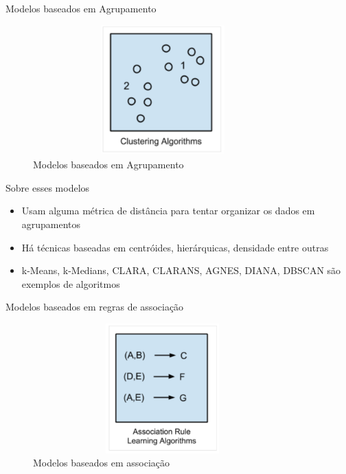 \begin{frame}	
	\begin{block}{Modelos baseados em Agrupamento}	
		\begin{figure}[!htb]
			\centering	  				
			\includegraphics[height=5cm, width = 10cm]{./pic/cluster.png}
			\caption{Modelos baseados em Agrupamento}
			\label{fig_modelos}
		\end{figure}
	\end{block}
\end{frame}


\begin{frame}	
	\begin{block}{Sobre esses modelos}	
		\begin{itemize}
			\item Usam alguma métrica de distância para tentar organizar os dados em agrupamentos
			\item Há técnicas baseadas em centróides, hierárquicas, densidade entre outras
			\item k-Means, k-Medians, CLARA, CLARANS, AGNES, DIANA, DBSCAN  são exemplos de algoritmos 
		\end{itemize}
	\end{block}
\end{frame}


\begin{frame}	
	\begin{block}{Modelos baseados em regras de associação}	
		\begin{figure}[!htb]
			\centering	  				
			\includegraphics[height=5cm, width = 10cm]{./pic/regrasAssociacao.png}
			\caption{Modelos baseados em associação}
			\label{fig_modelos}
		\end{figure}
	\end{block}
\end{frame}


